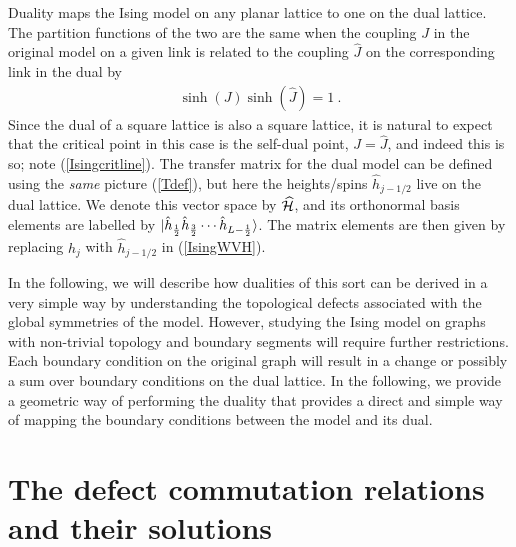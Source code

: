 \documentclass[11pt]{article}
\numberwithin{equation}{section}		%
\begin{document}
Duality maps the Ising model on any planar lattice to one on the dual lattice. The partition functions of the two are the same when the coupling $J$ in the original model on a given link is related to the coupling $\widehat{J}$ on the corresponding link in the dual by \cite{Kramers1941}
\begin{align}
\sinh(J)\sinh(\widehat{J})=1\ .
\label{Isingduality}
\end{align}
Since the dual of a square lattice is also a square lattice, it is natural to expect that the critical point in this case is the self-dual point, $J =\widehat{J}$, and indeed this is so; note (\ref{Isingcritline}). 
The transfer matrix for the dual model can be defined using the {\em same} picture (\ref{Tdef}), but here the heights/spins $\hat{h}_{j-1/2}$ live on the dual lattice. We denote this vector space by $\widehat{\cal H}$, and its orthonormal basis elements are labelled  by $\ket{\hat{h}_{\frac{1}{2}}\hat{h}_{\frac{3}{2}}\cdots \hat{h}_{L-\frac{1}{2}}}$. The matrix elements are then given by replacing $h_j$ with $\hat{h}_{j-1/2}$ in (\ref{IsingWVH}). 



In the following, we will describe how dualities of this sort can be derived in a very simple way by understanding the topological defects associated with the global symmetries of the model.
However, studying the Ising model on graphs with non-trivial topology and boundary segments will require further restrictions. Each boundary condition on the original graph will result in a change or possibly a sum over boundary conditions on the dual lattice. In the following, we provide a geometric way of performing the duality that provides a direct and simple way of mapping the boundary conditions between the model and its dual.


\section{The defect commutation relations and their solutions}
\label{sec:defcomm}
\end{document}
